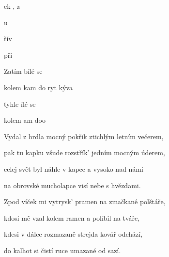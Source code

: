 

\zs
{}ek   , 
 z  

u    
  

řív    
  

 při    
\ks

\zr
Zatím  bílé   se

kolem kam  do ryt 
kýva

tyhle ílé   se

kolem am doo
\kr

\zs
Vydal z hrdla mocný pokřik ztichlým letním večerem,

pak tu kapku všude rozstřík' jedním mocným úderem,

celej svět byl náhle v kapce a vysoko nad námi

na obrovské mucholapce visí nebe s hvězdami.
\ks

\zr \kr

\zs
Zpod víček mi vytrysk' pramen na zmačkané polštáře,

kdosi mě vzal kolem ramen a políbil na tváře,

kdesi v dálce rozmazaně strejda kovář odchází,

do kalhot si čistí ruce umazané od sazí.
\ks
{}              


\kp






